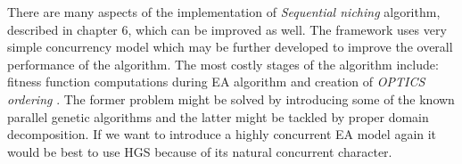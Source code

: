 There are many aspects of the implementation of \textit{Sequential
niching} algorithm, described in chapter 6, which can be improved as well. 
The framework uses very simple concurrency model which may be further
developed to improve the overall performance of the algorithm.
The most costly stages of the algorithm include: fitness function computations
during EA algorithm and creation of \textit{OPTICS ordering} \cite{optics}.
The former problem might be solved by introducing some of the known
parallel genetic algorithms and the latter might be tackled by proper
domain decomposition. If we want to introduce a highly concurrent EA model
again it would be best to use HGS because of its natural concurrent character.
